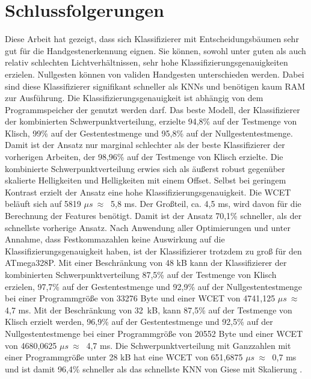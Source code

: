 \chapter{Schlussfolgerungen}
Diese Arbeit hat gezeigt, dass sich Klassifizierer mit Entscheidungsbäumen sehr gut für die Handgestenerkennung eignen. Sie können, sowohl unter guten als auch
relativ schlechten Lichtverhältnissen, sehr hohe Klassifizierungsgenauigkeiten erzielen. Nullgesten können von validen Handgesten unterschieden werden. Dabei sind diese Klassifizierer signifikant
schneller als KNNs und benötigen kaum RAM zur Ausführung. Die Klassifizierungsgenauigkeit ist abhängig von dem Programmspeicher der genutzt werden darf.
\newline
\newline
Das beste Modell, der Klassifizierer der kombinierten Schwerpunktverteilung, erzielte 94,8\% auf der Testmenge von Klisch, 99\% auf der Gestentestmenge und 95,8\% auf der Nullgestentestmenge. Damit
ist der Ansatz nur marginal schlechter als der beste Klassifizierer der vorherigen Arbeiten, der 98,96\% auf der Testmenge von Klisch erzielte. Die kombinierte Schwerpunktverteilung erwies sich als
äußerst robust gegenüber skalierte Helligkeiten und Helligkeiten mit einem Offset. Selbst bei geringem Kontrast erzielt der Ansatz eine hohe Klassifizierungsgenauigkeit. Die WCET beläuft
sich auf 5819 $\mu s\ \approx\ $ 5,8 ms. Der Großteil, ca. 4,5 ms, wird davon für die Berechnung der Features benötigt. Damit ist der Ansatz 70,1\% schneller, als der schnellste vorherige Ansatz.
Nach Anwendung aller Optimierungen und unter Annahme, dass Festkommazahlen keine Auswirkung auf die Klassifizierungsgenauigkeit haben, ist der Klassifizierer trotzdem zu groß für den ATmega328P.
\newline
\newline
Mit einer Beschränkung von 48 kB kann der Klassifizierer der kombinierten Schwerpunktverteilung 87,5\% auf der Testmenge von Klisch erzielen, 97,7\% auf
der Gestentestmenge und 92,9\% auf der Nullgestentestmenge bei einer Programmgröße von 33276 Byte und einer WCET von 4741,125 $\mu s\ \approx\ $ 4,7 ms. Mit der Beschränkung von 32\ kB, kann 87,5\% auf der
Testmenge von Klisch erzielt werden, 96,9\% auf der Gestentestmenge und 92,5\% auf der Nullgestentestmenge bei einer Programmgröße von 20552 Byte und einer WCET von 4680,0625 $\mu s\ \approx\ $ 4,7 ms.
\newline
\newline
Die Schwerpunktverteilung mit Ganzzahlen mit einer Programmgröße unter 28 kB hat eine WCET von 651,6875 $\mu s\ \approx\ $ 0,7 ms und ist damit 96,4\% schneller als das schnellste KNN von Giese mit Skalierung \cite{gieseThesis}.
